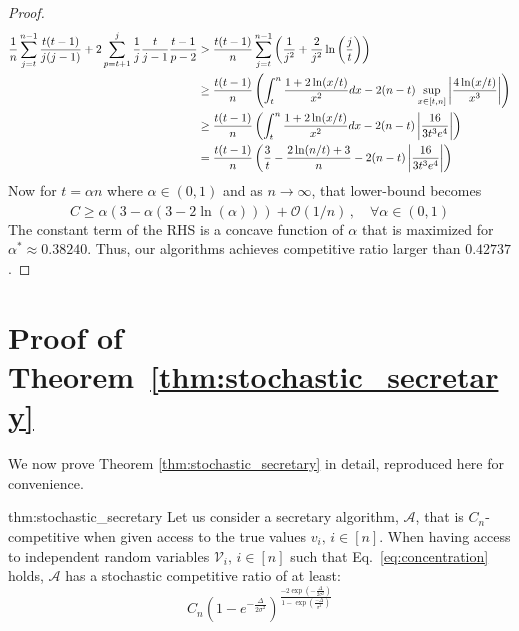 \begin{proof}
\begin{align}
    \frac{1}{n} \sum_{j = t}^{n-1}\frac{t(t - 1)}{j (j - 1)} + 2 \sum_{p = t + 1}^{j}\frac{1}{j}\frac{t}{j - 1}\frac{t-1}{p-2} 
    & > \frac{t(t-1)}{n}\sum_{j = t}^{n-1}\left(\frac{1}{j^2} + \frac{2}{j^2}\ln\left(\frac{j}{t}\right)\right) \\
    & \geq \frac{t(t-1)}{n}\left(\int_{t}^{n}  \frac{1+2\ln(x/t)}{x^2} dx - 2(n-t) \sup_{x \in [t,n]} \left| 
    \frac{4 \ln(x/t)}{x ^3}\right| \right) \notag \\
    & \geq  \frac{t(t-1)}{n}\left(\int_{t}^{n}  \frac{1+2\ln(x/t)}{x^2} dx - 2(n-t) \left| \frac{16}{3 t^3 e^4} \right| \right) \notag \\
    & = 
    \frac{t(t -1)}{n} \left(\frac{3}{t}-\frac{2\ln(n/t) + 3}{n} - 2(n-t) \left| \frac{16}{3 t^3 e^4} \right|\right) 
\end{align}
Now for $t = \alpha n$ where $\alpha \in (0, 1)$ and as $n \xrightarrow[]{} \infty$, that lower-bound becomes 
\begin{equation}
C \geq \alpha (3 - \alpha(3 - 2\ln (\alpha))) + \mathcal{O}(1/n) \,,\quad \forall \alpha \in (0,1)
\end{equation}
The constant term of the RHS is a concave function of $\alpha$ that is maximized for $\alpha^* \approx 0.38240$. Thus, our algorithms achieves competitive ratio larger than $0.42737$.
\end{proof}


\clearpage



\section{Proof of Theorem~\ref{thm:stochastic_secretary}}
\label{appendix:proof_thm2}
We now prove Theorem \ref{thm:stochastic_secretary} in detail, reproduced here for convenience. 

\begin{reptheorem}{thm:stochastic_secretary}
Let us consider a secretary algorithm, $\mathcal{A}$, that is $C_n$-competitive when given access to the true values $v_i, \,i \in [n]$. When having access to independent random variables $\mathcal{V}_{i},\, i\in [n]$ such that Eq.~\ref{eq:concentration} holds, $\mathcal{A}$ has a stochastic competitive ratio of at least:  
\begin{equation}
    C_n \left( 1-e^{- \frac{\Delta}{2 \sigma^2}} \right)^{\frac{-2 \exp(- \frac{\Delta}{2 \sigma^2})}{1 -  \exp(\frac{-\Delta}{\sigma^2})}}
\end{equation}
\end{reptheorem}

